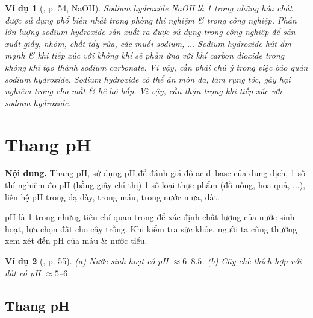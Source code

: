 \documentclass{article}
\newtheorem{vidu}{Ví dụ}
\begin{document}
\begin{vidu}[\cite{SGK_KHTN_8_Canh_Dieu}, p. 54, NaOH]
	Sodium hydroxide \emph{NaOH} là 1 trong những hóa chất được sử dụng phổ biến nhất trong phòng thí nghiệm \& trong công nghiệp. Phần lớn lượng sodium hydroxide sản xuất ra được sử dụng trong công nghiệp để sản xuất giấy, nhôm, chất tẩy rửa, các muối sodium, $\ldots$ Sodium hydroxide hút ẩm mạnh \& khi tiếp xúc với không khí sẽ phản ứng với khí carbon dioxide trong không khí tạo thành sodium carbonate. Vì vậy, cần phải chú ý trong việc bảo quản sodium hydroxide. Sodium hydroxide có thể ăn mòn da, làm rụng tóc, gây hại nghiêm trọng cho mắt \& hệ hô hấp. Vì vậy, cần thận trọng khi tiếp xúc với sodium hydroxide.
\end{vidu}
\noindent{}


\section{Thang pH}
\textsf{\textbf{Nội dung.} Thang pH, sử dụng pH để đánh giá độ acid--base của dung dịch, 1 số thí nghiệm đo pH (bằng giấy chỉ thị) 1 số loại thực phẩm (đồ uống, hoa quả, $\ldots$), liên hệ pH trong dạ dày, trong máu, trong nước mưa, đất.}

pH là 1 trong những tiêu chí quan trọng để xác định chất lượng của nước sinh hoạt, lựa chọn đất cho cây trồng. Khi kiểm tra sức khỏe, người ta cũng thường xem xét đến pH của máu \& nước tiểu.

\begin{vidu}[\cite{SGK_KHTN_8_Canh_Dieu}, p. 55]
	(a) Nước sinh hoạt có pH $\approx6$--$8.5$. (b) Cây chè thích hợp với đất có pH $\approx5$--$6$.
\end{vidu}

\subsection{Thang pH}
\end{document}
